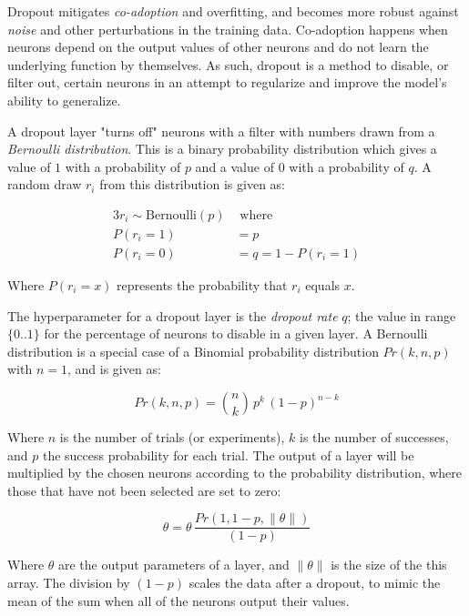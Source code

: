 \documentclass[a4paper]{report}
\begin{document}
Dropout mitigates \emph{co-adoption} and overfitting, and becomes more robust against \emph{noise} and other perturbations in the training data. Co-adoption happens when neurons depend on the output values of other neurons and do not learn the underlying function by themselves. As such, dropout is a method to disable, or filter out, certain neurons in an attempt to regularize and improve the model's ability to generalize.

A dropout layer "turns off" neurons with a filter with numbers drawn from a \emph{Bernoulli distribution}. This is a binary probability distribution which gives a value of $1$ with a probability of $p$ and a value of $0$ with a probability of $q$. A random draw $r_i$ from this distribution is given as:

\begin{alignat*}{3}
    r_i \sim \text{Bernoulli}(p) &\text{ where } \\
    P(r_i=1) &= p \\
    P(r_i=0) &= q = 1 - P(r_i=1)
\end{alignat*}

Where $P(r_i=x)$ represents the probability that $r_i$ equals $x$.

The hyperparameter for a dropout layer is the \emph{dropout rate} $q$; the value in range $\{0..1\}$ for the percentage of neurons to disable in a given layer. A Bernoulli distribution is a special case of a Binomial probability distribution $Pr(k,n,p)$ with $n=1$, and is given as:

\begin{equation*}
    Pr(k,n,p) = \binom{n}{k} \, p^k \, (1-p)^{n-k}
\end{equation*}

Where $n$ is the number of trials (or experiments), $k$ is the number of successes, and $p$ the success probability for each trial. The output of a layer will be multiplied by the chosen neurons according to the probability distribution, where those that have not been selected are set to zero:

\begin{equation*}
    \theta = \theta \, \frac{Pr(1, 1-p, \|\theta\|)}{(1-p)}
\end{equation*}

Where $\theta$ are the output parameters of a layer, and $\|\theta\|$ is the size of the this array. The division by $(1-p)$ scales the data after a dropout, to mimic the mean of the sum when all of the neurons output their values.
\end{document}
